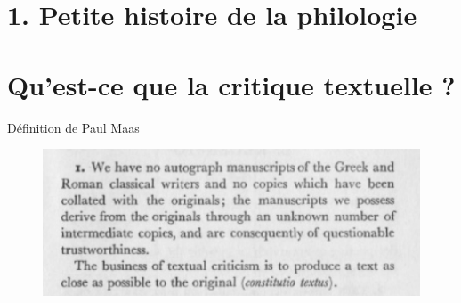 \documentclass[11pt]{beamer}
\begin{document}
\section{1. Petite histoire de la philologie}

\section{Qu'est-ce que la critique textuelle ?}

\begin{frame}{Définition de Paul Maas}
    \begin{figure}
        \centering
        \includegraphics[width=1\linewidth]{img/maas_definition.png}
    \end{figure}
    \tiny{\footnotesize{}}
\end{frame}
\end{document}
